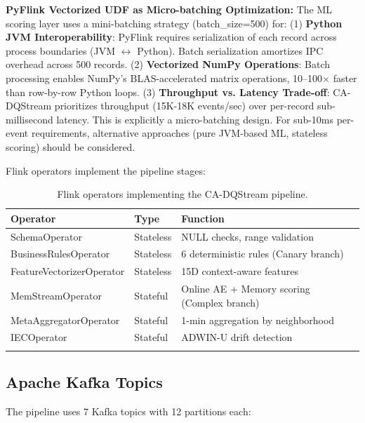 \begin{itemize}
\textbf{PyFlink Vectorized UDF as Micro-batching Optimization:} The ML scoring layer uses a mini-batching strategy (batch\_size=500) for: (1) \textbf{Python JVM Interoperability}: PyFlink requires serialization of each record across process boundaries (JVM $\leftrightarrow$ Python). Batch serialization amortizes IPC overhead across 500 records. (2) \textbf{Vectorized NumPy Operations}: Batch processing enables NumPy's BLAS-accelerated matrix operations, 10--100$\times$ faster than row-by-row Python loops. (3) \textbf{Throughput vs. Latency Trade-off}: CA-DQStream prioritizes throughput (15K-18K events/sec) over per-record sub-millisecond latency. This is explicitly a micro-batching design. For sub-10ms per-event requirements, alternative approaches (pure JVM-based ML, stateless scoring) should be considered.

\end{itemize}

Flink operators implement the pipeline stages:

\begin{longtable}{|m{4cm}|m{3.5cm}|m{5.5cm}|}
\hline
\textbf{Operator} & \textbf{Type} & \textbf{Function} \\ \hline
SchemaOperator & Stateless & NULL checks, range validation \\ \hline
BusinessRulesOperator & Stateless & 6 deterministic rules (Canary branch) \\ \hline
FeatureVectorizerOperator & Stateless & 15D context-aware features \\ \hline
MemStreamOperator & Stateful & Online AE + Memory scoring (Complex branch) \\ \hline
MetaAggregatorOperator & Stateful & 1-min aggregation by neighborhood \\ \hline
IECOperator & Stateful & ADWIN-U drift detection \\ \hline
\caption{Flink operators implementing the CA-DQStream pipeline.}
\label{tab:flink_operators}
\end{longtable}

\subsection{Apache Kafka Topics}

The pipeline uses 7 Kafka topics with 12 partitions each:

